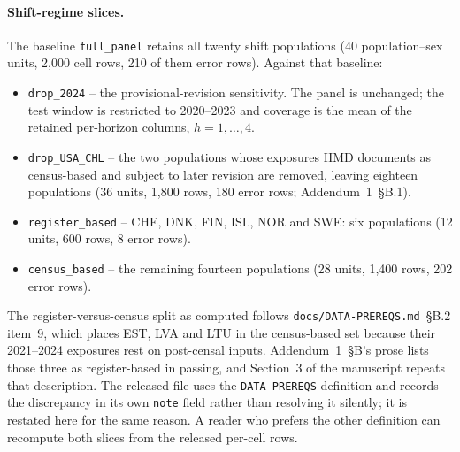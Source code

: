 \paragraph{Shift-regime slices.} The baseline \texttt{full\_panel} retains all
twenty shift populations (40 population--sex units, 2{,}000 cell rows, 210 of
them error rows). Against that baseline:
\begin{itemize}
\item \texttt{drop\_2024} -- the provisional-revision sensitivity. The panel is
  unchanged; the test window is restricted to 2020--2023 and coverage is the
  mean of the retained per-horizon columns, $h=1,\dots,4$.
\item \texttt{drop\_USA\_CHL} -- the two populations whose exposures HMD
  documents as census-based and subject to later revision are removed, leaving
  eighteen populations (36 units, 1{,}800 rows, 180 error rows;
  Addendum~1~\S B.1).
\item \texttt{register\_based} -- CHE, DNK, FIN, ISL, NOR and SWE: six
  populations (12 units, 600 rows, 8 error rows).
\item \texttt{census\_based} -- the remaining fourteen populations (28 units,
  1{,}400 rows, 202 error rows).
\end{itemize}
The register-versus-census split as computed follows
\texttt{docs/DATA-PREREQS.md}~\S B.2 item~9, which places EST, LVA and LTU in
the census-based set because their 2021--2024 exposures rest on post-censal
inputs. Addendum~1~\S B's prose lists those three as register-based in passing,
and Section~3 of the manuscript repeats that description. The released file uses
the \texttt{DATA-PREREQS} definition and records the discrepancy in its own
\texttt{note} field rather than resolving it silently; it is restated here for
the same reason. A reader who prefers the other definition can recompute both
slices from the released per-cell rows.

